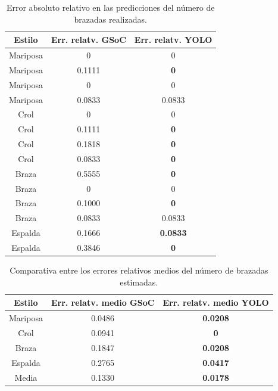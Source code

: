 \begin{table}[]
    \centering
    \small
    \begin{tabular}{|c|c|c|} \hline
         Estilo & Err. relatv. GSoC & Err. relatv. YOLO  \\ \hline 
         Mariposa & 0 & 0 \\
         Mariposa & 0.1111 & \textbf{0} \\
         Mariposa & 0 & 0 \\
         Mariposa & 0.0833 & 0.0833 \\
         Crol & 0 & 0 \\
         Crol & 0.1111 & \textbf{0} \\
         Crol & 0.1818 & \textbf{0} \\
         Crol & 0.0833 & \textbf{0} \\
         Braza & 0.5555 & \textbf{0} \\
         Braza & 0 & 0 \\
         Braza & 0.1000 & \textbf{0} \\
         Braza & 0.0833 & 0.0833 \\
         Espalda & 0.1666 & \textbf{0.0833} \\
         Espalda & 0.3846 & \textbf{0} \\ \hline
    \end{tabular}
    \caption{Error absoluto relativo en las predicciones del número de brazadas realizadas.} 
    \label{tab:tablaerroresbrazadascap5}
\end{table}

\begin{table}[]
    \centering
    \small
    \begin{tabular}{|c|c|c|} \hline
         Estilo & Err. relatv. medio GSoC & Err. relatv. medio YOLO  \\ \hline
         Mariposa & 0.0486 & \textbf{0.0208} \\
         Crol & 0.0941 & \textbf{0}  \\   
         Braza & 0.1847 & \textbf{0.0208} \\
         Espalda & 0.2765 & \textbf{0.0417} \\
         Media & 0.1330 & \textbf{0.0178} \\ \hline
    \end{tabular}
    \caption{Comparativa entre los errores relativos medios del número de brazadas estimadas.}
    \label{tab:tablaerroresmediosbrazadas}
\end{table} 

